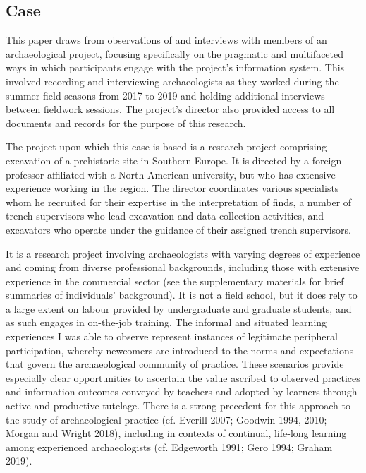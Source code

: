 \documentclass[
]{article}
\begin{document}
\subsection{Case}\label{case}

This paper draws from observations of and interviews with members of an
archaeological project, focusing specifically on the pragmatic and
multifaceted ways in which participants engage with the project's
information system. This involved recording and interviewing
archaeologists as they worked during the summer field seasons from 2017
to 2019 and holding additional interviews between fieldwork sessions.
The project's director also provided access to all documents and records
for the purpose of this research.

The project upon which this case is based is a research project
comprising excavation of a prehistoric site in Southern Europe. It is
directed by a foreign professor affiliated with a North American
university, but who has extensive experience working in the region. The
director coordinates various specialists whom he recruited for their
expertise in the interpretation of finds, a number of trench supervisors
who lead excavation and data collection activities, and excavators who
operate under the guidance of their assigned trench supervisors.

It is a research project involving archaeologists with varying degrees
of experience and coming from diverse professional backgrounds,
including those with extensive experience in the commercial sector (see
the supplementary materials for brief summaries of individuals'
background). It is not a field school, but it does rely to a large
extent on labour provided by undergraduate and graduate students, and as
such engages in on-the-job training. The informal and situated learning
experiences I was able to observe represent instances of legitimate
peripheral participation, whereby newcomers are introduced to the norms
and expectations that govern the archaeological community of practice.
These scenarios provide especially clear opportunities to ascertain the
value ascribed to observed practices and information outcomes conveyed
by teachers and adopted by learners through active and productive
tutelage. There is a strong precedent for this approach to the study of
archaeological practice (cf. Everill 2007; Goodwin 1994, 2010; Morgan
and Wright 2018), including in contexts of continual, life-long learning
among experienced archaeologists (cf. Edgeworth 1991; Gero 1994; Graham
2019).
\end{document}
